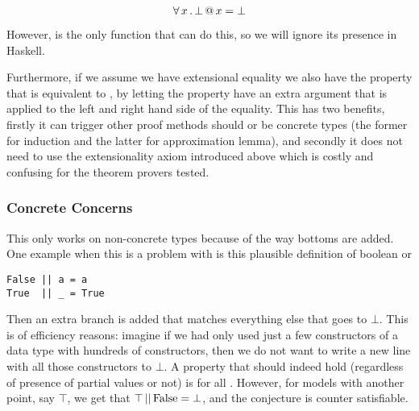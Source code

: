 \begin{equation*}
\forall \, x \, . \, \bot \, @ \, x = \bot
\end{equation*}

However,  is the only function that can do this, so we will
ignore its presence in Haskell.

Furthermore, if we assume we have extensional equality we also have
the property that  is equivalent to
, by letting the property have an extra argument that
is applied to the left and right hand side of the equality. This has
two benefits, firstly it can trigger other proof methods should 
or  be concrete types (the former for induction and the latter
for approximation lemma), and secondly it does not need to use the
extensionality axiom introduced above which is costly and confusing
for the theorem provers tested.

\subsubsection{Concrete Concerns}

This only works on non-concrete types because of the way bottoms are
added. One example when this is a problem with is this plausible
definition of boolean or

\begin{verbatim}
False || a = a
True  || _ = True
\end{verbatim}

Then an extra branch is added that matches everything else that goes
to $\bot$. This is of efficiency reasons: imagine if we had only used
just a few constructors of a data type with hundreds of constructors,
then we do not want to write a new line with all those constructors to
$\bot$. A property that should indeed hold (regardless of presence of
partial values or not) is  for all
. However, for models with another point, say $\top$, we get
that $\top \, \mathrm{||} \, \mathrm{False} = \bot$, and the conjecture is
counter satisfiable.


